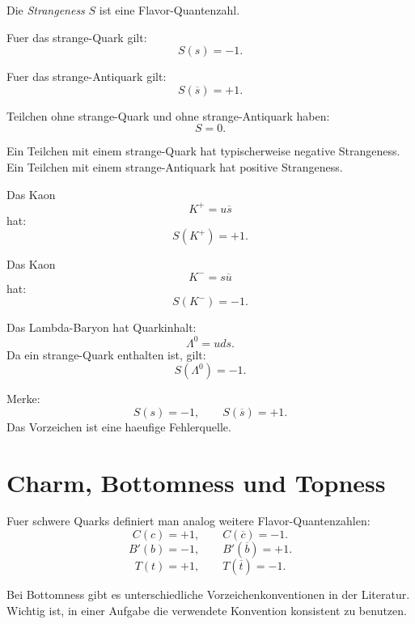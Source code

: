 \begin{definitionbox}
Die \emph{Strangeness} $S$ ist eine Flavor-Quantenzahl.

Fuer das strange-Quark gilt:
\[
    S(s)=-1.
\]

Fuer das strange-Antiquark gilt:
\[
    S(\overline{s})=+1.
\]
\end{definitionbox}

\begin{conceptbox}
Teilchen ohne strange-Quark und ohne strange-Antiquark haben:
\[
    S=0.
\]

Ein Teilchen mit einem strange-Quark hat typischerweise negative Strangeness.
Ein Teilchen mit einem strange-Antiquark hat positive Strangeness.
\end{conceptbox}

\begin{examplebox}
Das Kaon
\[
    K^+ = u\overline{s}
\]
hat:
\[
    S(K^+)=+1.
\]

Das Kaon
\[
    K^- = s\overline{u}
\]
hat:
\[
    S(K^-)=-1.
\]
\end{examplebox}

\begin{examplebox}
Das Lambda-Baryon hat Quarkinhalt:
\[
    \Lambda^0 = uds.
\]
Da ein strange-Quark enthalten ist, gilt:
\[
    S(\Lambda^0)=-1.
\]
\end{examplebox}

\begin{examtipbox}
Merke:
\[
    S(s)=-1,
    \qquad
    S(\overline{s})=+1.
\]
Das Vorzeichen ist eine haeufige Fehlerquelle.
\end{examtipbox}

\section{Charm, Bottomness und Topness}

\begin{definitionbox}
Fuer schwere Quarks definiert man analog weitere Flavor-Quantenzahlen:
\[
    C(c)=+1,
    \qquad
    C(\overline{c})=-1.
\]
\[
    B'(b)=-1,
    \qquad
    B'(\overline{b})=+1.
\]
\[
    T(t)=+1,
    \qquad
    T(\overline{t})=-1.
\]
\end{definitionbox}

\begin{notebox}
Bei Bottomness gibt es unterschiedliche Vorzeichenkonventionen in der Literatur.
Wichtig ist, in einer Aufgabe die verwendete Konvention konsistent zu benutzen.
\end{notebox}

